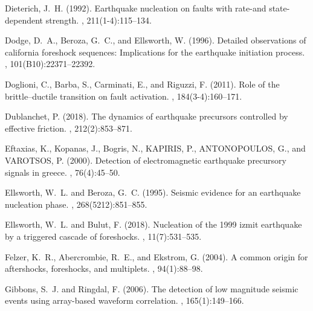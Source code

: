 \documentclass[a4paper,12pt,twoside]{article}
\begin{document}
\begin{thebibliography}{}
Dieterich, J.~H. (1992).
\newblock Earthquake nucleation on faults with rate-and state-dependent
  strength.
, 211(1-4):115--134.

Dodge, D.~A., Beroza, G.~C., and Ellsworth, W. (1996).
\newblock Detailed observations of california foreshock sequences: Implications
  for the earthquake initiation process.
,
  101(B10):22371--22392.

Doglioni, C., Barba, S., Carminati, E., and Riguzzi, F. (2011).
\newblock Role of the brittle--ductile transition on fault activation.
,
  184(3-4):160--171.

Dublanchet, P. (2018).
\newblock The dynamics of earthquake precursors controlled by effective
  friction.
, 212(2):853--871.
  
Eftaxias, K., Kopanas, J., Bogris, N., KAPIRIS, P., ANTONOPOULOS, G., and
  VAROTSOS, P. (2000).
\newblock Detection of electromagnetic earthquake precursory signals in greece.
, 76(4):45--50.

Ellsworth, W.~L. and Beroza, G.~C. (1995).
\newblock Seismic evidence for an earthquake nucleation phase.
, 268(5212):851--855.

Ellsworth, W.~L. and Bulut, F. (2018).
\newblock Nucleation of the 1999 izmit earthquake by a triggered cascade of
  foreshocks.
, 11(7):531--535.

Felzer, K.~R., Abercrombie, R.~E., and Ekstrom, G. (2004).
\newblock A common origin for aftershocks, foreshocks, and multiplets.
, 94(1):88--98.

Gibbons, S.~J. and Ringdal, F. (2006).
\newblock The detection of low magnitude seismic events using array-based
  waveform correlation.
, 165(1):149--166.


\end{thebibliography}
\end{document}
